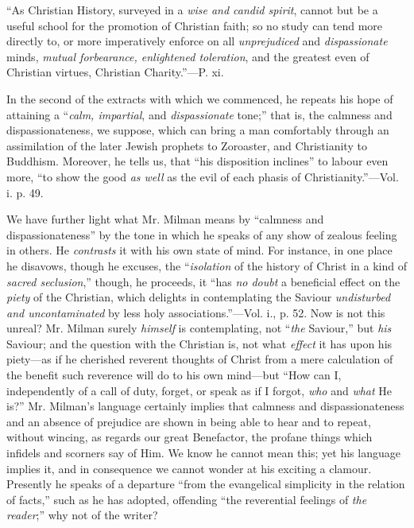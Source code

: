 ``As Christian History, surveyed in
a \emph{wise and candid spirit}, cannot but be a useful school for the
promotion of Christian faith; so no study can tend more directly to,
or more imperatively enforce on all \emph{unprejudiced} and \emph{dispassionate}
minds, \emph{mutual forbearance, enlightened toleration}, and the
greatest even of Christian virtues, Christian Charity.''—P. xi.

In the second of the extracts with which we
commenced, he repeats his hope of attaining a ``\emph{calm, impartial},
and \emph{dispassionate} tone;'' that is, the calmness and
dispassionateness, we suppose, which can bring a man comfortably
through an assimilation of the later Jewish prophets to Zoroaster, and
Christianity to Buddhism. Moreover, he tells us, that ``his disposition
inclines'' to labour even more, ``to show the good \emph{as well} as the
evil of each phasis of Christianity.''—Vol. i. p. 49.

We have further light what Mr. Milman means by ``calmness
and dispassionateness'' by the tone in which he speaks of any show of
zealous feeling in others. He \emph{contrasts} it with his own state
of mind. For instance, in one place he disavows, though he excuses,
the ``\emph{isolation} of the history of Christ in a kind of \emph{sacred
seclusion},'' though, he proceeds, it ``has \emph{no doubt} a
beneficial effect on the \emph{piety} of the Christian, which delights
in contemplating the Saviour \emph{undisturbed and uncontaminated} by
less holy associations.''—Vol. i., p. 52. Now is not this unreal? Mr.
Milman surely \emph{himself} is contemplating, not ``\emph{the} Saviour,'' but \emph{his}
Saviour; and the question with the Christian is, not what \emph{effect}
it has upon his piety—as if he cherished reverent thoughts of Christ
from a mere calculation of the benefit such reverence will do to
his own mind—but ``How can I, independently of a call of duty,
forget, or speak as if I forgot, \emph{who} and \emph{what} He is?''
Mr. Milman's language certainly implies that calmness and
dispassionateness and an absence of prejudice are shown in being able
to hear and to repeat, without wincing, as regards our great
Benefactor, the profane things which infidels and scorners say of Him.
We know he cannot mean this; yet his language implies it, and in
consequence we cannot wonder at his exciting a clamour. Presently he
speaks of a departure ``from the evangelical simplicity in the relation
of facts,'' such as he has adopted, offending ``the reverential feelings
of \emph{the reader};'' why not of the writer?

